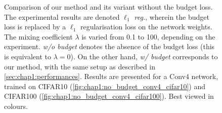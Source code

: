 \begin{figure}
  \centering
  \caption{ Comparison of our method and its variant without the budget loss.
    The experimental results are denoted \emph{$\ell_1$ reg.}, wherein the budget
    loss is replaced by a $\ell_1$ regularisation loss on the network weights. The
    mixing coefficient $\lambda$ is varied from 0.1 to 100, depending on the
    experiment. \emph{w/o budget} denotes the absence of the budget loss (this
    is equivalent to $\lambda = 0$). On the other hand, \emph{w/ budget}
    corresponds to our method, with the same setup as described in
    \cref{sec:chap1:performances}. Results are presented for a Conv4 network,
    trained on CIFAR10 (\cref{fig:chap1:no_budget_conv4_cifar10}) and CIFAR100
    (\cref{fig:chap1:no_budget_conv4_cifar100}). Best viewed in colours.}
  \label{fig:chap1:no_budget_conv4}
\end{figure}



